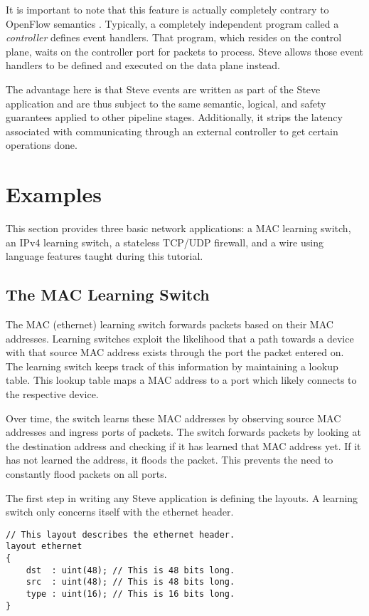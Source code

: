 It is important to note that this feature is actually completely contrary to OpenFlow semantics
\cite{openflow_spec}. Typically, a completely independent program called a \textit{controller} defines event
handlers. That program, which resides on the control plane, waits on the controller port for packets to process.
Steve allows those event handlers to be defined and executed on the data plane instead.

The advantage here is that Steve events are written as part of the Steve
application and are thus subject to the same semantic, logical, and safety
guarantees applied to other pipeline stages. Additionally, it strips the latency associated with communicating through an external controller to get certain operations done.

\section{Examples} \label{tut:examples}

This section provides three basic network applications: a MAC learning switch, an IPv4 learning switch, a stateless TCP/UDP firewall, and a
wire using language features taught during this tutorial.

\subsection{The MAC Learning Switch} \label{tut:learning_switch}

The MAC (ethernet) learning switch forwards packets based on their MAC addresses. Learning switches exploit the likelihood that a
path towards a device with that source MAC address exists through
the port the packet entered on. The learning switch keeps track of this information by maintaining a lookup table. This lookup table maps a MAC address to a port which likely connects to the respective device. 

Over time, the switch learns these MAC addresses by observing source MAC addresses and ingress ports of packets. The switch forwards packets by
looking at the destination address and checking if it has learned that MAC
address yet. If it has not learned the address, it floods the packet. This prevents the need to constantly flood packets on all ports.

The first step in writing any Steve application is defining the layouts. A
learning switch only concerns itself with the ethernet header.

\begin{codepage}
\begin{lstlisting}
// This layout describes the ethernet header.
layout ethernet
{
	dst  : uint(48); // This is 48 bits long.
	src  : uint(48); // This is 48 bits long.
	type : uint(16); // This is 16 bits long.
}
\end{lstlisting}
\end{codepage}


